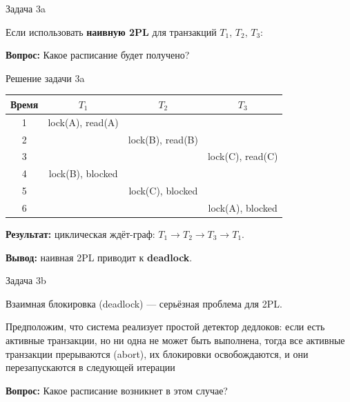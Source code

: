 \documentclass{beamer}
\begin{document}

\begin{frame}{Задача 3a}

Если использовать \textbf{наивную 2PL} для транзакций $T_1$, $T_2$, $T_3$:

\vspace{0.5em}

\textbf{Вопрос:}  
Какое расписание будет получено?

\end{frame}

\begin{frame}{Решение задачи 3a}

\small
\begin{center}
\begin{tabular}{c|c|c|c}
\textbf{Время} & \textbf{$T_1$} & \textbf{$T_2$} & \textbf{$T_3$} \\ \hline
1 & lock(A), read(A) &  &  \\
2 &  & lock(B), read(B) &  \\
3 &  &  & lock(C), read(C) \\
4 & lock(B), blocked &  &  \\
5 &  & lock(C), blocked &  \\
6 &  &  & lock(A), blocked \\
\end{tabular}
\end{center}

\vspace{0.5em}

\textbf{Результат:} циклическая ждёт-граф: $T_1 \to T_2 \to T_3 \to T_1$.

\vspace{0.3em}

\textbf{Вывод:} наивная 2PL приводит к \textbf{deadlock}.

\end{frame}


\begin{frame}{Задача 3b}

Взаимная блокировка (deadlock) — серьёзная проблема для 2PL.

\vspace{0.5em}

Предположим, что система реализует простой детектор дедлоков:
если есть активные транзакции,
но ни одна не может быть выполнена,
тогда все активные транзакции прерываются (abort),
их блокировки освобождаются,
и они перезапускаются в следующей итерации

\vspace{0.5em}

\textbf{Вопрос:}  
Какое расписание возникнет в этом случае?

\end{frame}
\end{document}
